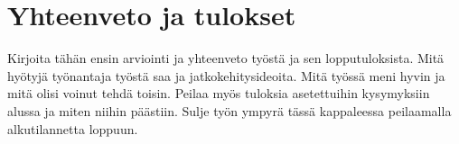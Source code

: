 \chapter{Yhteenveto ja tulokset}
\label{ch:yhteenveto ja tulokset}
Kirjoita tähän ensin arviointi ja yhteenveto työstä ja sen lopputuloksista. Mitä hyötyjä työnantaja työstä saa ja jatkokehitysideoita. Mitä työssä meni hyvin ja mitä olisi voinut tehdä toisin. Peilaa myös tuloksia asetettuihin kysymyksiin alussa ja miten niihin päästiin. Sulje työn ympyrä tässä kappaleessa peilaamalla alkutilannetta loppuun.